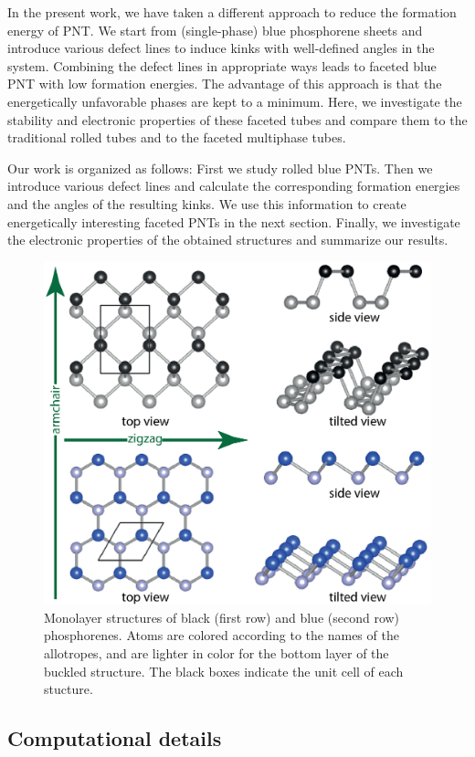 In the present work, we have taken a different approach to reduce the formation energy of PNT. We start from (single-phase) blue phosphorene sheets and introduce various defect lines to induce kinks with well-defined angles in the system. Combining the defect lines in appropriate ways leads to faceted blue PNT with low formation energies. The advantage of this approach is that the energetically unfavorable phases are kept to a minimum. Here, we investigate the stability and electronic properties of these faceted tubes and compare them to the traditional rolled tubes and to the faceted multiphase tubes. 

Our work is organized as follows: First we study rolled blue PNTs. Then we introduce various defect lines and calculate the corresponding formation energies and the angles of the resulting kinks. We use this information to create energetically interesting faceted PNTs in the next section. Finally, we investigate the electronic properties of the obtained structures and summarize our results.


\begin{figure}[htbp]
\centering
\includegraphics[width=0.7\linewidth]{Nanotu_monolayer_structures.eps}%
\caption{Monolayer structures of black (first row) and blue (second row) phosphorenes. Atoms are colored according to the names of the allotropes, and are lighter in color for the bottom layer of the buckled structure. The black boxes indicate the unit cell of each stucture. \label{natu_monolayer}}
\end{figure}

\subsection{Computational details}

